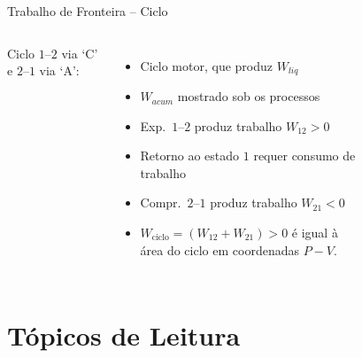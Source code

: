     \begin{frame}{Trabalho de Fronteira -- Ciclo}\vspace*{-2em}
        \begin{columns}
        Ciclo $1$--$2$ via `C' e $2$--$1$ via `A':
        \begin{itemize}
            \item<1> Ciclo \alert{motor}, que \alert{produz} $W_{liq}$
            \item<1> $W_{acum}$ mostrado sob os processos
            \item<1> Exp.~$1$--$2$ \alert{produz} trabalho $W_{12} > 0$
            \item<1> Retorno ao estado $1$ requer \alert{consumo} de trabalho
            \item<1> Compr.~$2$--$1$ \alert{produz} trabalho $W_{21} < 0$
            \item<1> $W_{\mathrm{ciclo}} = (W_{12} + W_{21}) > 0$ é igual à \alert{área do
                ciclo} em \alert{coordenadas $P-V$}.
        \end{itemize}
            \begin{figure}
            \end{figure}
        \end{columns}
    \end{frame}

\section{Tópicos de Leitura}

